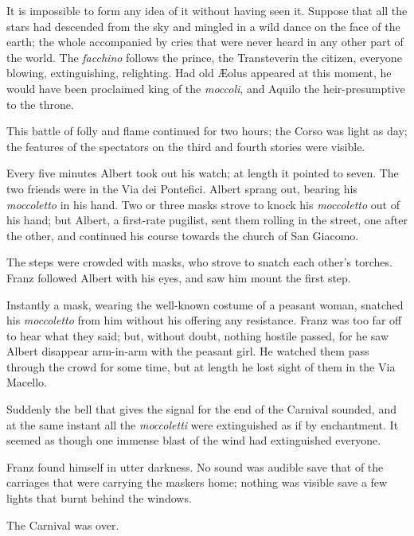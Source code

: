 It is impossible to form any idea of it without having seen it. Suppose that all the stars had descended from the sky and mingled in a wild dance on the face of the earth; the whole accompanied by cries that were never heard in any other part of the world. The \textit{facchino} follows the prince, the Transteverin the citizen, everyone blowing, extinguishing, relighting. Had old Æolus appeared at this moment, he would have been proclaimed king of the \textit{moccoli}, and Aquilo the heir-presumptive to the throne. 

 This battle of folly and flame continued for two hours; the Corso was light as day; the features of the spectators on the third and fourth stories were visible. 

 Every five minutes Albert took out his watch; at length it pointed to seven. The two friends were in the Via dei Pontefici. Albert sprang out, bearing his \textit{moccoletto} in his hand. Two or three masks strove to knock his \textit{moccoletto} out of his hand; but Albert, a first-rate pugilist, sent them rolling in the street, one after the other, and continued his course towards the church of San Giacomo. 

 The steps were crowded with masks, who strove to snatch each other's torches. Franz followed Albert with his eyes, and saw him mount the first step. 

 Instantly a mask, wearing the well-known costume of a peasant woman, snatched his \textit{moccoletto} from him without his offering any resistance. Franz was too far off to hear what they said; but, without doubt, nothing hostile passed, for he saw Albert disappear arm-in-arm with the peasant girl. He watched them pass through the crowd for some time, but at length he lost sight of them in the Via Macello. 

 Suddenly the bell that gives the signal for the end of the Carnival sounded, and at the same instant all the \textit{moccoletti} were extinguished as if by enchantment. It seemed as though one immense blast of the wind had extinguished everyone. 

 Franz found himself in utter darkness. No sound was audible save that of the carriages that were carrying the maskers home; nothing was visible save a few lights that burnt behind the windows. 

 The Carnival was over.